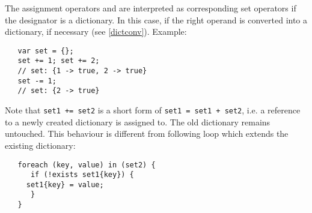 \label{setassignment}
The assignment operators \token{+=} and \token{-=} are interpreted
as corresponding set operators if the designator is a
dictionary.
In this case, if the right operand is converted into a dictionary,
if necessary (see \ref{dictconv}). Example:

\begin{lstlisting}
   var set = {};
   set += 1; set += 2;
   // set: {1 -> true, 2 -> true}
   set -= 1;
   // set: {2 -> true}
\end{lstlisting}

\noindent
Note that \lstinline!set1 += set2! is a short form of
\lstinline!set1 = set1 + set2!, i.e. a reference to a newly
created dictionary is assigned to. The old dictionary remains
untouched. This behaviour is different from following loop
which extends the existing dictionary:

\begin{lstlisting}
   foreach (key, value) in (set2) {
      if (!exists set1{key}) {
	 set1{key} = value;
      }
   }
\end{lstlisting}

\endinput
